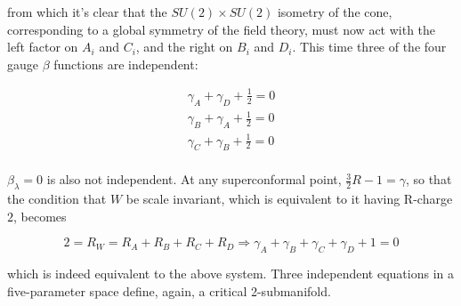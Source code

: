 from which it's clear that the $SU(2) \times SU(2)$ isometry of the cone, corresponding to a global symmetry of the field theory, must now act with the left factor on $A_i$ and $C_i$, and the right on $B_i$ and $D_i$. This time three of the four gauge $\beta$ functions are independent:

\begin{align}
	\gamma_A + \gamma_D + \frac{1}{2} = 0 \\
	\gamma_B + \gamma_A + \frac{1}{2} = 0 \\
	\gamma_C + \gamma_B + \frac{1}{2} = 0 \\
\end{align}

$\beta_\lambda = 0$ is also not independent. At any superconformal point, $\frac{3}{2}R - 1 = \gamma$, so that the condition that $W$ be scale invariant, which is equivalent to it having R-charge $2$, becomes

\begin{equation}
	2 = R_W = R_A + R_B + R_C + R_D \Rightarrow \gamma_A + \gamma_B + \gamma_C + \gamma_D + 1 = 0
	\label{}
\end{equation}

which is indeed equivalent to the above system. Three independent equations in a five-parameter space define, again, a critical 2-submanifold.

\cmmnt{~\\modulispace}

